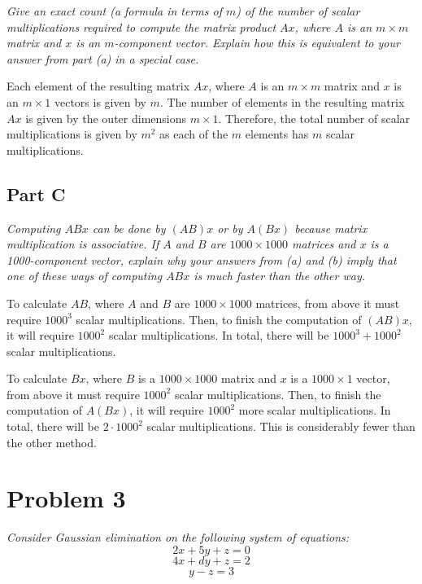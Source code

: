 \documentclass{article}
\begin{document}
\textit{Give an exact count (a formula in terms of $ m $) of the
number of scalar multiplications required to compute the matrix product $ Ax $,
where $ A $ is an $ m \times m $ matrix and  $ x $ is an $ m $-component vector.
Explain how this is equivalent to your answer from part (a) in a special case.}

\bigbreak

Each element of the resulting matrix $ Ax $, where $ A $ is an $ m \times m $
matrix and $ x $ is an $ m \times 1 $ vectors is given by $ m $. The number of
elements in the resulting matrix $ Ax $ is given by the outer dimensions $ m
\times 1 $. Therefore, the total number of scalar multiplications is given by $
m^2 $ as each of the $ m $ elements has $ m $ scalar multiplications.

\subsection*{Part C}

\textit{ Computing $ ABx $ can be done by $ (AB)x $ or by  $ A(Bx) $ because
matrix multiplication is associative. If $ A $ and $ B $ are $ 1000 \times 1000
$ matrices and $ x $ is a 1000-component vector, explain why your answers from
(a) and (b) imply that one of these ways of computing $ ABx $ is much faster
than the other way.}

\bigbreak

To calculate $ AB $, where $ A $ and $ B $ are $ 1000 \times 1000 $ matrices,
from above it must require $ 1000^3 $ scalar multiplications. Then, to finish
the computation of $ (AB)x $, it will require $ 1000^2 $ scalar multiplications.
In total, there will be $ 1000^3 + 1000^2 $ scalar multiplications.

To calculate $ Bx $, where $ B $ is a $ 1000 \times 1000 $ matrix and $ x $ is
a $ 1000 \times 1 $ vector, from above it must require $ 1000^2 $ scalar
multiplications. Then, to finish the computation of $ A(Bx) $, it will require $
1000^2 $ more scalar multiplications. In total, there will be $ 2 \cdot 1000^2 $
scalar multiplications. This is considerably fewer than the other method.

\section*{Problem 3}

\textit{Consider Gaussian elimination on the following system of equations:}
$$ 2x + 5y + z = 0 $$
$$ 4x + dy + z = 2 $$
$$ y - z = 3 $$
\end{document}
